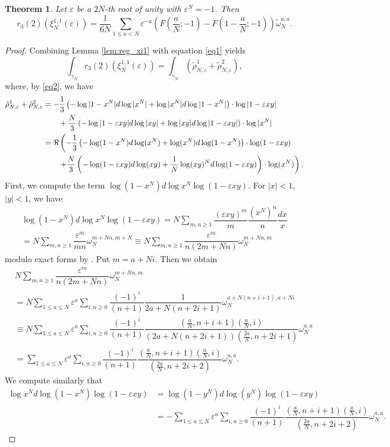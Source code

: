 \documentclass[11pt,a4,leqno]{amsart}
\theoremstyle{my theoremstyle}
\newtheorem{thm}{Theorem}[section]
\theoremstyle{dfn}
\theoremstyle{remark}
\renewcommand{\1}{\mathbbm{1}}
\newcommand{\e}{\varepsilon}
\numberwithin{equation}{section}
\begin{document}
\begin{thm}\label{thm:reg_hyperg}
Let $\e$ be a $2N$-th root of unity with $\e^N=-1$. Then 
\[
r_3(2) (\xi_N^{1,1}(\e))=\dfrac1{6N} \sum_{1 \leq a <N} \e^{-a} \left(F\left(\dfrac{a}{N};-1 \right) - F\left(1-\dfrac{a}{N};-1 \right)\right) \widetilde{\omega}_N^{a, a}. 
\]
\end{thm}

\begin{proof}
Combining Lemma \ref{lem:reg_xi1} with equation \eqref{eq1} yields
\[
\int_{\gamma_N} r_3(2)(\xi_N^{1,1}(\varepsilon))=\int_{\gamma_N} (\tilde\rho_{N,\varepsilon}^1+\tilde\rho_{N,\varepsilon}^2),
\]
where, by \eqref{eq2}, we have
\begin{align*}
\tilde\rho_{N,\varepsilon}^1+\tilde\rho_{N,\varepsilon}^2 & =  -\frac13 \left(-\log|1-x^N| d\log|x^N| + \log |x^N| d\log|1-x^N| \right) \cdot \log|1- \e xy| \notag \\
& \qquad + \frac{N}3 \left(-\log|1- \e xy| d\log|xy| + \log |xy| d\log|1- \e xy| \right) \cdot \log|x^N|  \notag \\
&=\Re\left( -\frac13 \left(-\log(1-x^N) d\log(x^N) + \log (x^N) d\log(1-x^N) \right) \cdot \log(1- \e xy)  \right.  \\
& \qquad\left.  + \frac{N}3 \left(-\log(1- \e xy) d\log(xy) + \frac1N \log (xy)^N d\log(1- \e xy) \right) \cdot \log(x^N) \right).  \notag 
\end{align*}
First, we compute the term $\log(1-x^N) d\log x^N \log(1- \e xy)$. 
For $|x|<1$, $|y|<1$, we have 
\begin{multline*}
\log(1-x^N) d\log x^N  \log(1- \e xy)
= N \sum_{m, n \ge 1} \dfrac{(\e xy)^m}{m} \dfrac{(x^N)^n}{n} \dfrac{dx}x \\
=N \sum_{m, n \ge 1} \dfrac{\e^m}{mn} \omega_N^{m+Nn, m+N} \equiv N \sum_{m, n \ge 1} \dfrac{\e^m}{n(2m+Nn)} \omega_N^{m+Nn, m}
\end{multline*}
modulo exact forms by \cite[Lemma 4.19]{Ots11}. 
Put $m=a+Ni$. Then we obtain 
\begin{align*}
&N \sum_{m, n \ge 1} \dfrac{\e^m}{n(2m+Nn)} \omega_N^{m+Nn, m} \\
&= N \sum_{1 \leq a \leq N} \e^a\sum_{i, n \ge 0} \dfrac{(-1)^i}{(n+1)} \dfrac{1}{2a+N(n+2i+1)} \omega_N^{a+N(n+i+1), a+Ni} \\
&\equiv  N \sum_{1 \leq a \leq N} \e^a\sum_{i, n \ge 0} \dfrac{(-1)^i}{(n+1)} \dfrac{\left(\frac{a}N, n+i+1 \right)\left(\frac{a}N, i \right)}{(2a+N(n+2i+1)) \left(\frac{2a}N, n+2i+1 \right)} \omega_N^{a, a} \\
&=  \sum_{1 \leq a \leq N} \e^a\sum_{i, n \ge 0} \dfrac{(-1)^i}{(n+1)} \dfrac{\left(\frac{a}N, n+i+1 \right)\left(\frac{a}N, i \right)}{\left(\frac{2a}N, n+2i+2 \right)} \omega_N^{a, a}. 
\end{align*}
We compute similarly that 
\begin{align*}
\log x^N  d\log (1-x^N) \log(1- \e xy)&= \log (1-y^N)  d\log (y^N) \log(1- \e xy) \\
&=- \sum_{1 \leq a \leq N} \e^a\sum_{i, n \ge 0} \dfrac{(-1)^i}{(n+1)} \dfrac{\left(\frac{a}N, n+i+1 \right)\left(\frac{a}N, i \right)}{\left(\frac{2a}N, n+2i+2 \right)} \omega_N^{a, a}. 
\end{align*}


\end{proof}
\end{document}
